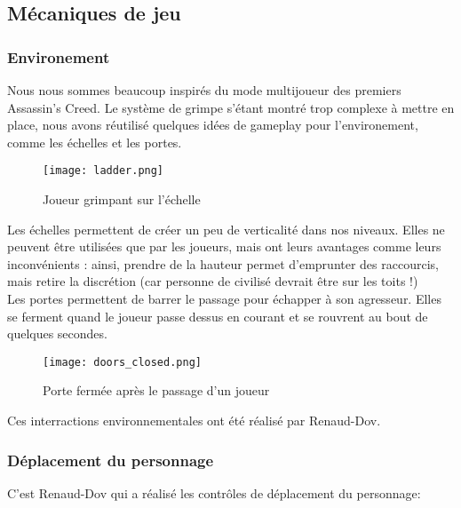 \subsection{Mécaniques de jeu}

        \subsubsection{Environement}
            Nous nous sommes beaucoup inspirés du mode multijoueur des premiers Assassin's Creed.
            Le système de grimpe s'étant montré trop complexe à mettre en place, 
            nous avons réutilisé quelques idées de gameplay pour l'environement, comme les échelles et les portes.\\

            \begin{figure}[hbt!]
                \centering
                \texttt{[image: ladder.png]}
                \caption{Joueur grimpant sur l'échelle}
            \end{figure}

            Les échelles permettent de créer un peu de verticalité dans nos niveaux.
            Elles ne peuvent être utilisées que par les joueurs, mais ont leurs avantages comme leurs inconvénients : ainsi,
            prendre de la hauteur permet d'emprunter des raccourcis, mais retire la discrétion (car personne de civilisé devrait être sur les toits !) \\
            
            Les portes permettent de barrer le passage pour échapper à son agresseur.
            Elles se ferment quand le joueur passe dessus en courant
            et se rouvrent au bout de quelques secondes.

            \begin{figure}[ht]
                \centering
                \texttt{[image: doors\_closed.png]}
                \caption{Porte fermée après le passage d'un joueur}
            \end{figure}

            Ces interractions environnementales ont été réalisé par Renaud-Dov.

        \subsubsection{Déplacement du personnage}
            C'est Renaud-Dov qui a réalisé les contrôles de déplacement du personnage:
        
